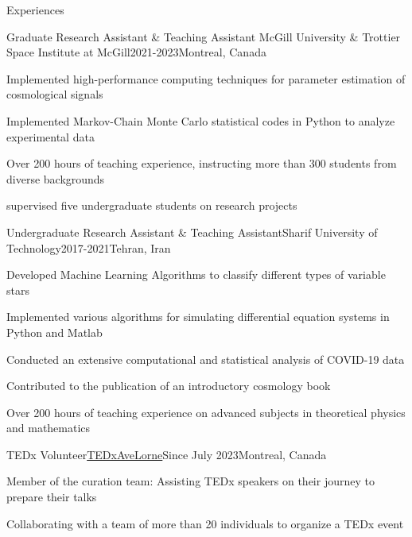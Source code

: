 \documentclass[]{kyvernitis-resume}
\begin{document}
\resumeheader
{}
{}
{}
{}

\midskip
\begin{section}{Experiences}
    \begin{subsection}
        {Graduate Research Assistant \& Teaching Assistant}
        {McGill University \& Trottier Space Institute at McGill}{2021-2023}{Montreal, Canada}
        
        \item Implemented high-performance computing techniques for parameter estimation of cosmological signals
        \item Implemented Markov-Chain Monte Carlo statistical codes in Python to analyze experimental data
        \item Over 200 hours of teaching experience, instructing more than 300 students from diverse backgrounds
        \item supervised five undergraduate students on research projects
        
    \end{subsection}
    
    \begin{subsection}{Undergraduate Research Assistant \& Teaching Assistant}{Sharif University of Technology}{2017-2021}{Tehran, Iran}
    \item Developed Machine Learning Algorithms to classify different types of variable stars
    \item Implemented various algorithms for simulating differential equation systems in Python and Matlab 
    \item Conducted an extensive computational and statistical analysis of COVID-19 data 
    \item Contributed to the publication of an introductory cosmology book
    \item Over 200 hours of teaching experience on advanced subjects in theoretical physics and mathematics

    \end{subsection}   
    \begin{subsection}
        {TEDx Volunteer}{\href{https://www.ted.com/tedx/events/53037}{TEDxAveLorne}}{Since July 2023}{Montreal, Canada}
        \item Member of the curation team: Assisting TEDx speakers on their journey to prepare their talks 
        \item Collaborating with a team of more than 20 individuals to organize a TEDx event
    \end{subsection}


\end{section}
\end{document}

